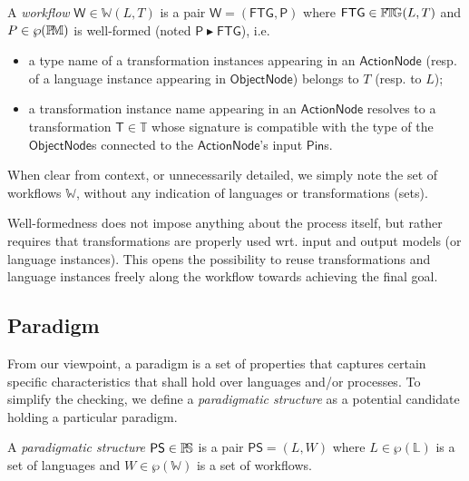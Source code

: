 \begin{Definition}[Workflow]
   A \emph{workflow} $\mathsf{W}\in\mathbb{W}(L, T)$ is a pair $\mathsf{W} = 
(\mathsf{FTG}, \mathsf{P})$ where $\mathsf{FTG}\in\mathbb{F}\!\mathbb{T}\!\mathbb{G}(L, T)$ and 
$P\in\wp(\mathbb{P}\!\mathbb{M})$ is well-formed (noted $\mathsf{P} \blacktriangleright 
\mathsf{FTG}$), i.e.
\begin{itemize}
   \item a type name of a transformation instances appearing in an
$\mathsf{ActionNode}$ (resp. of a language instance appearing in 
$\mathsf{ObjectNode}$) belongs to $T$ (resp. to $L$);
   \item a transformation instance name appearing in an $\mathsf{ActionNode}$
resolves to a transformation $\mathsf{T}\in\mathbb{T}$ whose signature is 
compatible with the type of the $\mathsf{ObjectNode}$s 
connected to the $\mathsf{ActionNode}$'s input $\mathsf{Pin}$s. 
\end{itemize}
\end{Definition}
\noindent
When clear from context, or unnecessarily detailed, we simply note the set of 
workflows $\mathbb{W}$, without any indication of languages or 
transformations (sets).

Well-formedness does not impose anything about the process itself, but rather 
requires that transformations are properly used wrt. input and output models 
(or language instances). This opens the possibility to reuse transformations 
and language instances freely along the workflow towards achieving the final 
goal.

\begin{Example}[]
   
\end{Example}



\subsection{Paradigm}
\label{sec:PS}

From our viewpoint, a paradigm is a set of properties that captures 
certain specific characteristics that shall hold over languages and/or 
processes. To simplify the checking, we define a \emph{paradigmatic structure} 
as a potential candidate holding a particular paradigm.

\begin{Definition}
   A \emph{paradigmatic structure} $\mathsf{PS}\in \mathbb{P}\!\mathbb{S}$ is a pair $\mathsf{PS} 
= (L, W)$ where $L\in \wp(\mathbb{L})$ is a set of languages and 
$W \in \wp(\mathbb{W})$ is a set of workflows.
\end{Definition}

